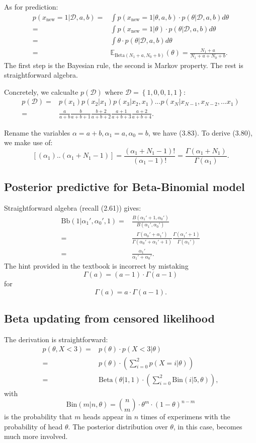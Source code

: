 \documentclass[UTF8]{ctexart}
\begin{document}
As for prediction:
$$
\begin{aligned}
p(x_{\text{new}}=1|\mathcal{D},a,b)=&\int p(x_{\text{new}}=1|\theta,a,b)\cdot p(\theta|\mathcal{D},a,b) d\theta \\
=&\int p(x_{\text{new}}=1|\theta)\cdot p(\theta|\mathcal{D},a,b) d\theta \\
=&\int \theta\cdot p(\theta|\mathcal{D},a,b) d\theta \\
=& \mathbb{E}_{\text{Beta}(N_{1}+a,N_{0}+b)}(\theta) = \frac{N_{1}+a}{N_{1}+a+N_{0}+b}.
\end{aligned}
$$
The first step is the Bayesian rule, the second is Markov property.
The rest is straightforward algebra.

Concretely, we calcualte $p(\mathcal{D})$ where $\mathcal{D}=\left\{1,0,0,1,1\right\}$:
\begin{align}
p(\mathcal{D})=&p(x_{1})p(x_{2}|x_{1})p(x_{3}|x_{2},x_{1})...p(x_{N}|x_{N-1},x_{N-2},...x_{1})\nonumber \\
=&\frac{a}{a+b}\frac{b}{a+b+1}\frac{b+2}{a+b+2}\frac{a+1}{a+b+3}\frac{a+2}{a+b+4}. \nonumber
\end{align}


Rename the variables $\alpha=a+b,\alpha_{1}=a,\alpha_{0}=b$, we have (3.83). To derive (3.80), we make use of:
$$[(\alpha_{1})..(\alpha_{1}+N_{1}-1)] = \frac{(\alpha_{1}+N_{1}-1)!}{(\alpha_{1}-1)!}=\frac{\Gamma(\alpha_{1}+N_{1})}{\Gamma(\alpha_{1})}.$$

\subsection{Posterior predictive for Beta-Binomial model}
Straightforward algebra (recall (2.61)) gives:
\begin{align}
\text{Bb}(1|\alpha_{1}',\alpha_{0}',1)=&\frac{B(\alpha_{1}'+1,\alpha_{0}')}{B(\alpha_{1}',\alpha_{0}')} \nonumber \\
=&\frac{\Gamma(\alpha_{0}'+\alpha_{1}')}{\Gamma(\alpha_{0}'+\alpha_{1}'+1)}\frac{\Gamma(\alpha_{1}'+1)}{\Gamma(\alpha_{1}')} \nonumber \\
=&\frac{\alpha_{1}'}{\alpha_{1}'+\alpha_{0}'}. \nonumber
\end{align}
The hint provided in the textbook is incorrect by mistaking
$$\Gamma(a)=(a-1)\cdot\Gamma(a-1)$$
for
$$\Gamma(a)=a\cdot\Gamma(a-1).$$


\subsection{Beta updating from censored likelihood}
The derivation is straightforward:
$$
\begin{aligned}
p(\theta,X < 3) =& p(\theta)\cdot p(X < 3| \theta) \\
=& p(\theta)\cdot \left(\sum_{i=0}^{2}p(X=i|\theta)\right) \\
=&\text{Beta}(\theta|1,1)\cdot \left(\sum_{i=0}^{2}\text{Bin}(i|5,\theta)\right),
\end{aligned}
$$
with
$$\text{Bin}(m|n,\theta)=\binom{n}{m}\cdot \theta^{m}\cdot(1-\theta)^{n-m}$$
is the probability that $m$ heads appear in $n$ times of experimens with the probability of head $\theta$.
The posterior distribution over $\theta$, in this case, becomes much more involved.
\end{document}
